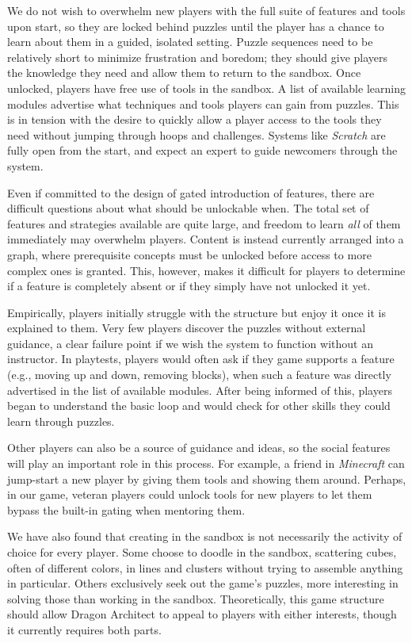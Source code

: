 \documentclass{sig-alternate}
\newcommand{\gametitle}{{Dragon Architect}}
\begin{document}
We do not wish to overwhelm new players with the full suite of features and tools upon start, so they are locked behind puzzles until the player has a chance to learn about them in a guided, isolated setting.
Puzzle sequences need to be relatively short to minimize frustration and boredom; they should give players the knowledge they need and allow them to return to the sandbox.
Once unlocked, players have free use of tools in the sandbox.
A list of available learning modules advertise what techniques and tools players can gain from puzzles.
This is in tension with the desire to quickly allow a player access to the tools they need without jumping through hoops and challenges. 
Systems like \emph{Scratch} are fully open from the start, and expect an expert to guide newcomers through the system.

Even if committed to the design of gated introduction of features, there are difficult questions about what should be unlockable when.
The total set of features and strategies available are quite large, and freedom to learn \emph{all} of them immediately may overwhelm players.
Content is instead currently arranged into a graph, where prerequisite concepts must be unlocked before access to more complex ones is granted.
This, however, makes it difficult for players to determine if a feature is completely absent or if they simply have not unlocked it yet.

Empirically, players initially struggle with the structure but enjoy it once it is explained to them.
Very few players discover the puzzles without external guidance, a clear failure point if we wish the system to function without an instructor.
In playtests, players would often ask if they game supports a feature (e.g., moving up and down, removing blocks), when such a feature was directly advertised in the list of available modules.
After being informed of this, players began to understand the basic loop and would check for other skills they could learn through puzzles.

Other players can also be a source of guidance and ideas, so the social features will play an important role in this process.
For example, a friend in \emph{Minecraft} can jump-start a new player by giving them tools and showing them around.
Perhaps, in our game, veteran players could unlock tools for new players to let them bypass the built-in gating when mentoring them.

We have also found that creating in the sandbox is not necessarily the activity of choice for every player. 
Some choose to doodle in the sandbox, scattering cubes, often of different colors, in lines and clusters without trying to assemble anything in particular.
Others exclusively seek out the game's puzzles, more interesting in solving those than working in the sandbox.
Theoretically, this game structure should allow \gametitle{} to appeal to players with either interests, though it currently requires both parts.
\end{document}

